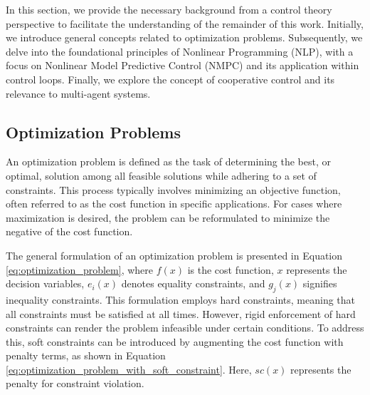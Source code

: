 In this section, we provide the necessary background from a control theory perspective to facilitate the understanding of the remainder of this work. Initially, we introduce general concepts related to optimization problems. Subsequently, we delve into the foundational principles of Nonlinear Programming (NLP), with a focus on Nonlinear Model Predictive Control (NMPC) and its application within control loops. Finally, we explore the concept of cooperative control and its relevance to multi-agent systems.

\subsection{Optimization Problems}

An optimization problem is defined as the task of determining the best, or optimal, solution among all feasible solutions while adhering to a set of constraints. This process typically involves minimizing an objective function, often referred to as the cost function in specific applications. For cases where maximization is desired, the problem can be reformulated to minimize the negative of the cost function.

The general formulation of an optimization problem is presented in Equation \ref{eq:optimization_problem}, where \( f(x) \) is the cost function, \( x \) represents the decision variables, \( e_i(x) \) denotes equality constraints, and \( g_j(x) \) signifies inequality constraints. This formulation employs hard constraints, meaning that all constraints must be satisfied at all times. However, rigid enforcement of hard constraints can render the problem infeasible under certain conditions. To address this, soft constraints can be introduced by augmenting the cost function with penalty terms, as shown in Equation \ref{eq:optimization_problem_with_soft_constraint}. Here, \( sc(x) \) represents the penalty for constraint violation.

